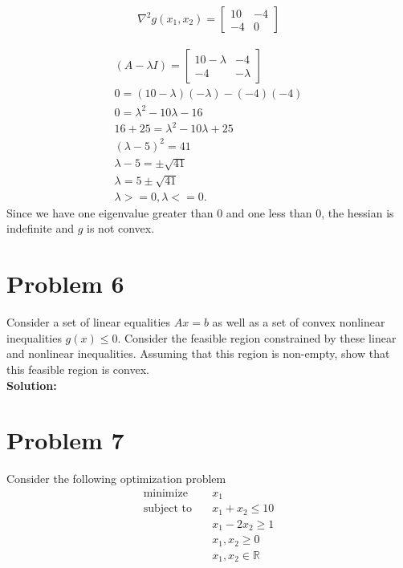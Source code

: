 \documentclass[11pt]{article}
\begin{document}
\begin{align*}
  \nabla^2 g(x_1, x_2) = 
  \begin{bmatrix}
    10  & -4 \\
    -4 & 0
  \end{bmatrix}
\end{align*}

\begin{align*}
  (A - \lambda I) = 
  \begin{bmatrix}
    10 - \lambda  & -4 \\
    -4 & - \lambda
  \end{bmatrix}
  \\
  0 = (10- \lambda)(-\lambda) - (-4)(-4) \\
  0 = \lambda^2 - 10 \lambda - 16  \\
  16 + 25 = \lambda^2 - 10 \lambda + 25 \\
  (\lambda - 5)^2 = 41 \\
  \lambda - 5 = \pm \sqrt{41} \\
  \lambda = 5 \pm \sqrt{41} \\
  \lambda >= 0, \lambda <=0.
\end{align*}
Since we have one eigenvalue greater than 0 and one less than 0, the hessian is indefinite and $g$ is not convex.

\section{Problem 6}
Consider a set of linear equalities $Ax = b$ as well as a set of convex nonlinear inequalities $g(x) \leq 0$. 
Consider the feasible region constrained by these linear and nonlinear inequalities.
Assuming that this region is non-empty, show that this feasible region is convex.
\\
\textbf{Solution: }

\section{Problem 7}
Consider the following optimization problem
\begin{align}
  \text{minimize} & \quad x_1 \\
  \text{subject to} & \quad x_1 + x_2 \leq 10 \\
  & \quad x_1 - 2x_2 \geq 1 \\
  & \quad x_1, x_2 \geq 0 \\
  & \quad x_1, x_2 \in \mathbb{R}
\end{align}
\end{document}
